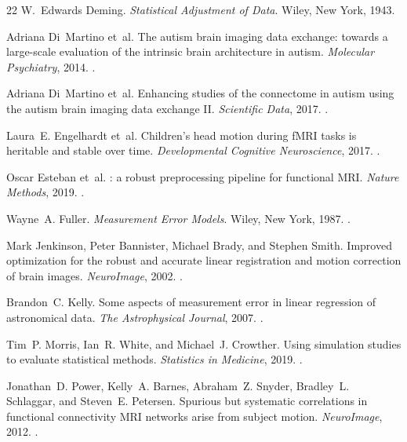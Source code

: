 \documentclass[11pt,a4paper]{article}
\begin{document}
\begin{thebibliography}{22}
W.~Edwards Deming.
\newblock \emph{Statistical Adjustment of Data}.
\newblock Wiley, New York, 1943.

Adriana Di~Martino et~al.
\newblock The autism brain imaging data exchange: towards a large-scale evaluation of the intrinsic brain architecture in autism.
\newblock \emph{Molecular Psychiatry}, 2014.
\newblock {}.

Adriana Di~Martino et~al.
\newblock Enhancing studies of the connectome in autism using the autism brain imaging data exchange {II}.
\newblock \emph{Scientific Data}, 2017.
\newblock {}.

Laura~E. Engelhardt et~al.
\newblock Children's head motion during {fMRI} tasks is heritable and stable over time.
\newblock \emph{Developmental Cognitive Neuroscience}, 2017.
\newblock {}.

Oscar Esteban et~al.
: a robust preprocessing pipeline for functional {MRI}.
\newblock \emph{Nature Methods}, 2019.
\newblock {}.

Wayne~A. Fuller.
\newblock \emph{Measurement Error Models}.
\newblock Wiley, New York, 1987.
\newblock {}.

Mark Jenkinson, Peter Bannister, Michael Brady, and Stephen Smith.
\newblock Improved optimization for the robust and accurate linear registration and motion correction of brain images.
\newblock \emph{NeuroImage}, 2002.
\newblock {}.

Brandon~C. Kelly.
\newblock Some aspects of measurement error in linear regression of astronomical data.
\newblock \emph{The Astrophysical Journal}, 2007.
\newblock {}.

Tim~P. Morris, Ian~R. White, and Michael~J. Crowther.
\newblock Using simulation studies to evaluate statistical methods.
\newblock \emph{Statistics in Medicine}, 2019.
\newblock {}.

Jonathan~D. Power, Kelly~A. Barnes, Abraham~Z. Snyder, Bradley~L. Schlaggar, and Steven~E. Petersen.
\newblock Spurious but systematic correlations in functional connectivity {MRI} networks arise from subject motion.
\newblock \emph{NeuroImage}, 2012.
\newblock {}.


\end{thebibliography}
\end{document}
